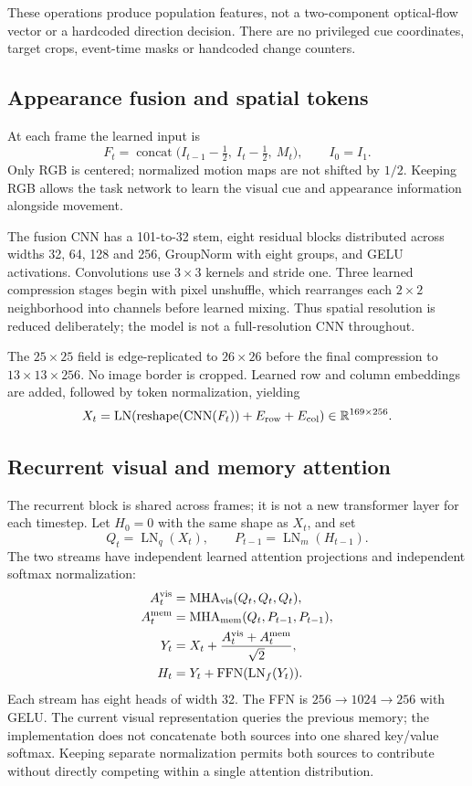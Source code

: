 \documentclass[11pt]{article}
\newcommand{\LN}{\operatorname{LN}}
\newcommand{\MHA}{\operatorname{MHA}}
\begin{document}
These operations produce population features, not a two-component optical-flow vector or a hardcoded direction decision. There are no privileged cue coordinates, target crops, event-time masks or handcoded change counters.

\subsection{Appearance fusion and spatial tokens}

At each frame the learned input is
\[
 F_t=\operatorname{concat}\bigl(I_{t-1}-\tfrac12,\ I_t-\tfrac12,\ M_t\bigr),
 \qquad I_0=I_1.
\]
Only RGB is centered; normalized motion maps are not shifted by $1/2$. Keeping RGB allows the task network to learn the visual cue and appearance information alongside movement.

The fusion CNN has a 101-to-32 stem, eight residual blocks distributed across widths 32, 64, 128 and 256, GroupNorm with eight groups, and GELU activations. Convolutions use $3\times3$ kernels and stride one. Three learned compression stages begin with pixel unshuffle, which rearranges each $2\times2$ neighborhood into channels before learned mixing. Thus spatial resolution is reduced deliberately; the model is not a full-resolution CNN throughout.

The $25\times25$ field is edge-replicated to $26\times26$ before the final compression to $13\times13\times256$. No image border is cropped. Learned row and column embeddings are added, followed by token normalization, yielding
\[
 X_t=\LN\!\left(\operatorname{reshape}(\operatorname{CNN}(F_t))+E_{\rm row}+E_{\rm col}\right)
 \in\mathbb R^{169\times256}.
\]

\subsection{Recurrent visual and memory attention}

The recurrent block is shared across frames; it is not a new transformer layer for each timestep. Let $H_0=0$ with the same shape as $X_t$, and set
\[
 Q_t=\LN_q(X_t),\qquad P_{t-1}=\LN_m(H_{t-1}).
\]
The two streams have independent learned attention projections and independent softmax normalization:
\begin{align*}
 A_t^{\rm vis}&=\MHA_{\rm vis}(Q_t,Q_t,Q_t),\\
 A_t^{\rm mem}&=\MHA_{\rm mem}(Q_t,P_{t-1},P_{t-1}),\\
 Y_t&=X_t+\frac{A_t^{\rm vis}+A_t^{\rm mem}}{\sqrt2},\\
 H_t&=Y_t+\operatorname{FFN}(\LN_f(Y_t)).
\end{align*}
Each stream has eight heads of width 32. The FFN is $256\rightarrow1024\rightarrow256$ with GELU. The current visual representation queries the previous memory; the implementation does not concatenate both sources into one shared key/value softmax. Keeping separate normalization permits both sources to contribute without directly competing within a single attention distribution.
\end{document}
